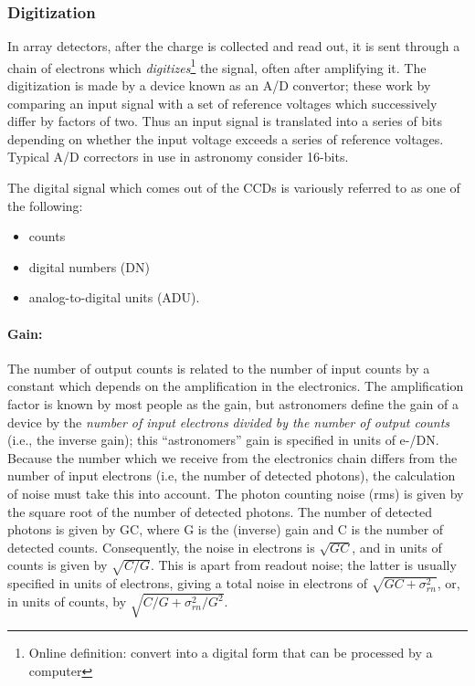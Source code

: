 \documentclass[12pt]{article}
\begin{document}
\subsubsection{Digitization}
In array detectors, after the charge is collected and read out, it is
sent through a chain of electrons which
\textit{digitizes}\footnote{Online definition: convert into a digital
form that can be processed by a computer}
the signal, often
after amplifying it. The digitization is made by a device known as an
A/D convertor; these work by comparing an input signal with a set of
reference voltages which successively differ by factors of two. Thus
an input signal is translated into a series of bits depending on
whether the input voltage exceeds a series of reference voltages.
Typical A/D correctors in use in astronomy consider 16-bits.

The digital signal which comes out of the CCDs is variously referred to as
one of the following:
\begin{itemize}
    \item counts
    \item digital numbers (DN)
    \item analog-to-digital units (ADU).
\end{itemize}
\paragraph{Gain:}
The number of output counts is related to the number of input counts by a
constant which depends on the amplification in the electronics. The
amplification factor is known by most people as the gain, but
astronomers define the gain of a device by the \textit{number of input
electrons divided by the number of output counts} (i.e., the inverse
gain); this ``astronomers'' gain is specified in units of e-/DN.
Because the number which we receive from the electronics chain differs
from the number of input electrons (i.e, the number of detected
photons), the calculation of noise must take this into account. The
photon counting noise (rms) is given by the square root of the number
of detected photons. The number of detected photons is given by GC,
where G is the (inverse) gain and C is the number of detected counts.
Consequently, the noise in electrons is $ \sqrt{{GC}}$, and in units
of counts is given by  $ \sqrt{{C/G}}$. This is apart from readout
noise; the latter is usually specified in units of electrons, giving a
total noise in electrons of  $ \sqrt{{GC+\sigma_{rn}^{2}}}$, or, in
units of counts, by  $ \sqrt{{C/G+\sigma_{rn}^{2}/G^{2}}}$.
\end{document}
